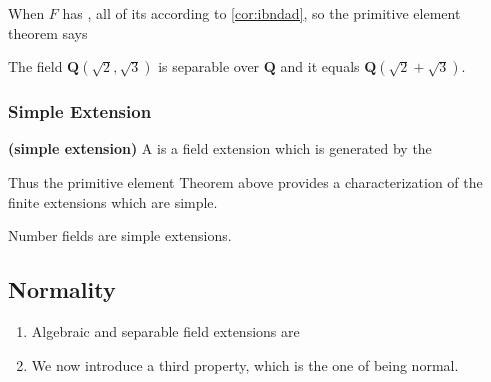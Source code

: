 \documentclass{article}
\newcommand{\bfs}[1]{\textbf{({#1}) }}
\begin{document}
\begin{cora}
    When $F$ has , all of its  according to \cref{cor:ibndad}, so the primitive element theorem says 
\end{cora}
\begin{exma}
The field $\mathbf{Q}(\sqrt{2}, \sqrt{3})$ is separable over $\mathbf{Q}$ and it equals $\mathbf{Q}(\sqrt{2}+\sqrt{3})$.
\end{exma}


\subsubsection{Simple Extension}
\begin{defa}\bfs{simple extension}
A  is a field extension which is generated by the 
\end{defa}

\begin{lema}
Thus the primitive element Theorem above provides a characterization of the finite extensions which are simple.
\end{lema}

\begin{cora}
    Number fields are simple extensions.
\end{cora}


\subsection{Normality}
\begin{enumerate}
    \item Algebraic and separable field extensions  are 
    \item  We now introduce a third property, which is  the one of being normal.
\end{enumerate}
\end{document}
